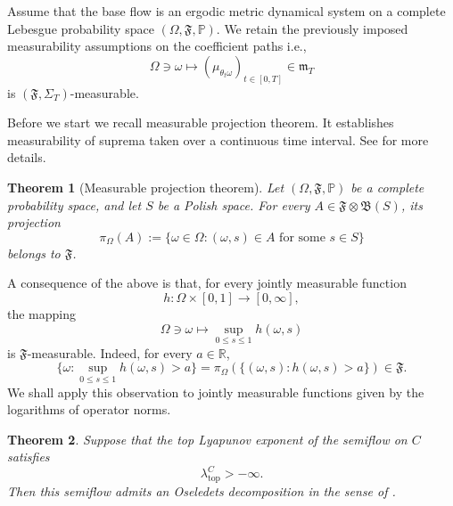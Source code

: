\documentclass[reqno]{amsart}
\theoremstyle{plain}
\newtheorem{theorem}{Theorem}[section]
\numberwithin{equation}{section}
\numberwithin{definition}{section}
\begin{document}
Assume that the base flow is an ergodic metric dynamical
system on a complete Lebesgue probability space
$(\Omega,\mathfrak F,\mathbb P)$.
We retain the previously imposed measurability assumptions
on the coefficient paths i.e., 
\begin{equation*}
    \Omega\ni\omega
    \mapsto
    (\mu_{\theta_t\omega})_{t\in[0,T]}
    \in\mathfrak m_T
\end{equation*}
is $(\mathfrak F,\Sigma_T)$-measurable. 


Before we start we recall measurable projection theorem. It establishes 
measurability of suprema taken over a continuous time interval. See \cite[Theorem~2.12 and Corollary~2.13, pp.~13--14]{Crauel2002} for more details. 

\begin{theorem}[Measurable projection theorem]
\label{thm:measurable-projection}
Let $(\Omega, \mathfrak F,\mathbb P)$ be a complete probability
space, and let $S$ be a Polish space. For every
$A\in \mathfrak F\otimes \mathfrak B(S)$, its projection
\begin{equation*}
    \pi_\Omega(A)
    :=
    \{\omega\in\Omega:
      (\omega,s)\in A \text{ for some }s\in S\}
\end{equation*}
belongs to $ \mathfrak F$.
\end{theorem}
A consequence of the above is that, for every jointly measurable
function
\begin{equation*}
    h:\Omega\times[0,1]\to[0,\infty],
\end{equation*}
the mapping
\begin{equation*}
    \Omega\ni\omega
    \mapsto \sup_{0\leq s\leq1}h(\omega,s)
\end{equation*}
is $ \mathfrak F$-measurable. Indeed, for every $a\in\mathbb R$,
\begin{equation*}
    \big\{\omega:
      \sup_{0\leq s\leq1}h(\omega,s)>a\big\}
    =
    \pi_\Omega
    (\{(\omega,s):h(\omega,s)>a\})
    \in\mathfrak F.
\end{equation*}
We shall apply this observation to jointly measurable functions
given by the logarithms of operator norms.

\begin{theorem}
Suppose that the top Lyapunov exponent of the semiflow
on $C$ satisfies
\begin{equation*}
    \lambda_{\mathrm{top}}^C>-\infty.
\end{equation*}
Then this semiflow admits an Oseledets decomposition
in the sense of
\cite[Definition~3.1]{MierczynskiNovoObaya2020}.
\end{theorem}
\end{document}
